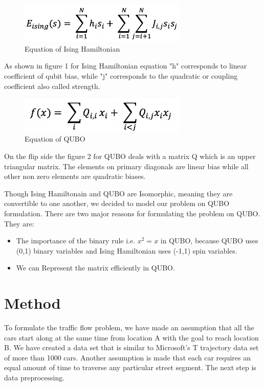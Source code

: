 \documentclass[conference]{IEEEtran}
\begin{document}
\begin{figure}[ht]
\centerline{\includegraphics[width=8cm]{Ising.png}}
\caption{Equation of Ising Hamiltonian}
\label{fig}
\end{figure}

As shown in figure 1 for Ising Hamiltonian equation "h" corresponds to linear coefficient of qubit bias, while "j" corresponds to the quadratic or coupling coefficient also called strength.\vspace{6pt}

\begin{figure}[ht]
\centerline{\includegraphics[width=8cm]{qubo.png}}
\caption{Equation of QUBO}
\label{fig}
\end{figure}

On the flip side the figure 2 for  QUBO deals with a matrix Q which is an upper triangular matrix. The elements on primary diagonals are linear bias while all other non zero elements are quadratic biases.\vspace{6pt}

Though Ising Hamiltonain and QUBO are Isomorphic, meaning they are convertible to one another, we decided to model our problem on QUBO formulation. There are two major reasons for formulating the problem on QUBO. They are:
\begin{itemize}
    \item The importance of the binary rule i.e. \(x^2= x\) in QUBO, because QUBO uses (0,1) binary variables and Ising Hamiltonian uses (-1,1) spin variables.\vspace{6pt}
    \item We can Represent the matrix efficiently in QUBO.
\end{itemize}

\section{Method}
To formulate the traffic flow problem, we have made an assumption that all the cars start along at the same time from location A with the goal to reach location B. We have created a data set that is similar to Microsoft's T trajectory data set of more than 1000 cars. Another assumption is made that each car requires an equal amount of time to traverse any particular street segment. The next step is data preprocessing.
\end{document}
